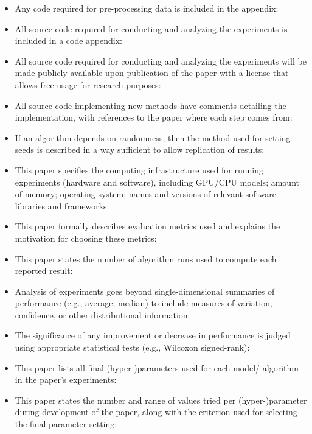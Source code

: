 \begin{itemize}
            \item Any code required for pre-processing data is included in the appendix: \checkmark
            \item All source code required for conducting and analyzing the experiments is included in a code appendix: \checkmark
            \item All source code required for conducting and analyzing the experiments will be made publicly available upon publication of the paper with a license that allows free usage for research purposes: \checkmark
            \item All source code implementing new methods have comments detailing the implementation, with references to the paper where each step comes from: \checkmark
            \item If an algorithm depends on randomness, then the method used for setting seeds is described in a way sufficient to allow replication of results: \checkmark
            \item This paper specifies the computing infrastructure used for running experiments (hardware and software), including GPU/CPU models; amount of memory; operating system; names and versions of relevant software libraries and frameworks: \checkmark
            \item This paper formally describes evaluation metrics used and explains the motivation for choosing these metrics: \checkmark
            \item This paper states the number of algorithm runs used to compute each reported result: \checkmark
            \item Analysis of experiments goes beyond single-dimensional summaries of performance (e.g., average; median) to include measures of variation, confidence, or other distributional information: \checkmark
            \item The significance of any improvement or decrease in performance is judged using appropriate statistical tests (e.g., Wilcoxon signed-rank): \checkmark
            \item This paper lists all final (hyper-)parameters used for each model/ algorithm in the paper’s experiments: \checkmark
            \item This paper states the number and range of values tried per (hyper-)parameter during development of the paper, along with the criterion used for selecting the final parameter setting: \checkmark
        \end{itemize}



%
